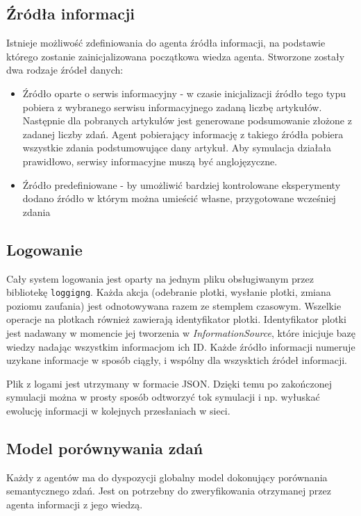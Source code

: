 \documentclass{article}
\begin{document}
	\subsection{Źródła informacji}
	Istnieje możliwość zdefiniowania do agenta źródła informacji, na podstawie którego zostanie zainicjalizowana początkowa wiedza agenta. Stworzone zostały dwa rodzaje źródeł danych:
	\begin{itemize}
		\item{Źródło oparte o serwis informacyjny - w czasie inicjalizacji źródło tego typu pobiera z wybranego serwisu informacyjnego zadaną liczbę artykułów. Następnie dla pobranych artykułów jest generowane podsumowanie złożone z zadanej liczby zdań. Agent pobierający informację z takiego źródła pobiera wszystkie zdania podstumowujące dany artykuł. Aby symulacja działała prawidłowo, serwisy informacyjne muszą być anglojęzyczne.}
		\item{Źródło predefiniowane - by umożliwić bardziej kontrolowane eksperymenty dodano źródło w którym można umieścić własne, przygotowane wcześniej zdania} 
	\end{itemize}
	\subsection{Logowanie}
	Cały system logowania jest oparty na jednym pliku obsługiwanym przez bibliotekę \texttt{loggigng}. Każda akcja (odebranie plotki, wysłanie plotki, zmiana poziomu zaufania) jest odnotowywana razem ze stemplem czasowym. Wszelkie operacje na plotkach również zawierają identyfikator plotki. Identyfikator plotki jest nadawany w momencie jej tworzenia w \textit{InformationSource}, które inicjuje bazę wiedzy nadając wszystkim informacjom ich ID. Każde źródło informacji numeruje uzykane informacje w sposób ciągły, i wspólny dla wszysktich źródeł informacji.

	Plik z logami jest utrzymany w formacie JSON. Dzięki temu po zakończonej symulacji można w prosty sposób odtworzyć tok symulacji i np. wyłuskać ewolucję informacji w kolejnych przesłaniach w sieci.
	\subsection{Model porównywania zdań}
	Każdy z agentów ma do dyspozycji globalny model dokonujący porównania semantycznego zdań. Jest on potrzebny do zweryfikowania otrzymanej przez agenta informacji z jego wiedzą. 
	
\end{document}
